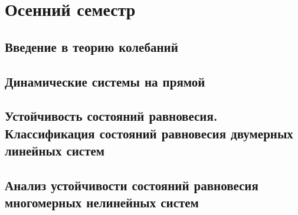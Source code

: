 \documentclass[14pt,a4paper]{extreport}
\theoremstyle{definition}
\begin{document}


\newpage
\tableofcontents 
\newpage
\part{Осенний семестр}
\chapter{Введение в теорию колебаний}
\label{lect1}
	


\newpage
\chapter{Динамические системы на прямой}
\label{lect2}
	

\newpage
\chapter{Устойчивость состояний равновесия. Классификация состояний равновесия двумерных линейных
систем}
\label{lect3}
	

\newpage
\chapter{Анализ устойчивости состояний равновесия многомерных нелинейных систем}
\label{lect4}
	
        



\end{document}
